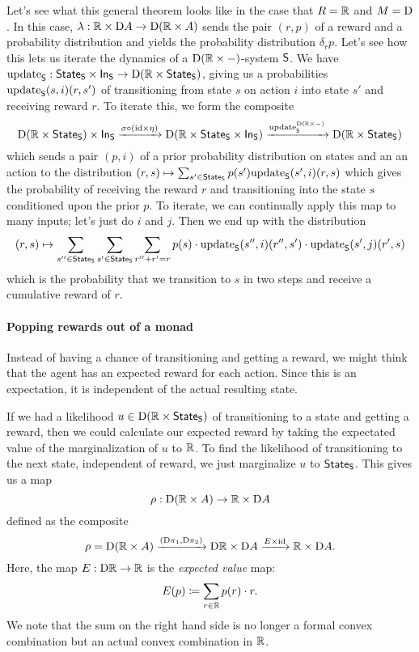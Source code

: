 \documentclass[DynamicalBook]{subfiles}
\begin{document}
\begin{example}
Let's see what this general theorem looks like in the case that $R = \mathbb{R}$ and $M
= \mathrm{D}$. In this case, $\lambda : \mathbb{R} \times \mathrm{D} A \to \mathrm{D} (\mathbb{R} \times A)$
sends the pair $(r, p)$ of a reward and a probability distribution and yields
the probability distribution $\delta_r p$.
Let's see how this lets us iterate the dynamics of a $\mathrm{D}(\mathbb{R}\times
-)$-system $\mathsf{S}$. We have $\mathrm{update}_{\mathsf{S}} : \mathsf{State}_{\mathsf{S}} \times \mathsf{In}_{\mathsf{S}} \to
\mathrm{D}(\mathbb{R} \times \mathsf{State}_{\mathsf{S}})$, giving us a probabilities
$\mathrm{update}_{\mathsf{S}}(s, i)(r, s')$ of transitioning from state $s$ on action $i$ into
state $s'$ and receiving reward $r$. To iterate this, we form the composite
$$\mathrm{D}(\mathbb{R} \times \mathsf{State}_{\mathsf{S}} ) \times \mathsf{In}_{\mathsf{S}}\xrightarrow{\sigma \circ (\mathrm{id} \times \eta)} 
\mathrm{D}(\mathbb{R} \times \mathsf{State}_{\mathsf{S}} \times \mathsf{In}_{\mathsf{S}}) \xrightarrow{\mathrm{update}_{\mathsf{S}}^{\mathrm{D}(\mathbb{R}
    \times -)}} \mathrm{D}(\mathbb{R} \times \mathsf{State}_{\mathsf{S}})$$
which sends a pair $(p, i)$ of a prior probability distribution on states and an
an action to the distribution $(r, s) \mapsto \sum_{s' \in \mathsf{State}_{\mathsf{S}}}p(s')
\mathrm{update}_{\mathsf{S}}(s', i)(r, s)$ which gives the probability of receiving the reward $r$
and transitioning into the state $s$ conditioned upon the prior $p$. To iterate,
we can continually apply this map to many inputs; let's just do $i$ and $j$. Then we end up
with the distribution
\[
(r, s) \mapsto \sum_{s'' \in \mathsf{State}_{\mathsf{S}}}\sum_{s' \in \mathsf{State}_{\mathsf{S}}}\sum_{r'' + r' = r}
p(s)\cdot\mathrm{update}_{\mathsf{S}}(s'', i)(r'', s')\cdot \mathrm{update}_{\mathsf{S}}(s', j)(r', s)
\]
which is the probability that we transition to $s$ in two steps and receive a
cumulative reward of $r$.
\end{example}


\paragraph{Popping rewards out of a monad}

Instead of having a chance of transitioning and getting a reward, we might think
that the agent has an expected reward for each action. Since this is an
expectation, it is independent of the actual resulting state.

If we had a likelihood $u \in \mathrm{D}(\mathbb{R} \times \mathsf{State}_{\mathsf{S}})$ of transitioning
to a state and getting a reward, then we could calculate our expected reward by
taking the expectated value of the marginalization of $u$ to $\mathbb{R}$. To find the
likelihood of transitioning to the next state, independent of reward, we just
marginalize $u$ to $\mathsf{State}_{\mathsf{S}}$. This gives
us a map
\[
\rho : \mathrm{D}(\mathbb{R} \times A) \to \mathbb{R} \times \mathrm{D} A
\]
defined as the composite 
\[
\rho = \mathrm{D}(\mathbb{R} \times A) \xrightarrow{(\mathrm{D} \pi_1, \mathrm{D} \pi_2)}
\mathrm{D} \mathbb{R} \times \mathrm{D} A \xrightarrow{E \times \mathrm{id}} \mathbb{R} \times \mathrm{D} A.
\]
Here, the map $E : \mathrm{D} \mathbb{R} \to \mathbb{R}$ is the \emph{expected value} map:
\[
E(p) \coloneqq \sum_{r \in \mathbb{R}} p(r) \cdot r.
\]
We note that the sum on the right hand side is no longer a formal convex
combination but an actual convex combination in $\mathbb{R}$.
\end{document}
